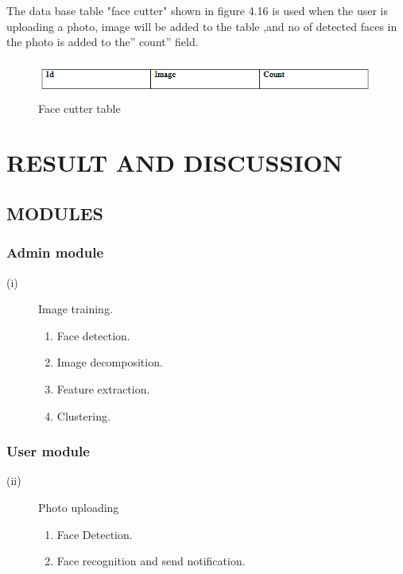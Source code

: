 \justifying
The data base table "face cutter" shown in figure 4.16 is used when the user is uploading a photo, image will be added to the table ,and no of detected faces in the   photo is added to the” count”  field.
\begin{figure}[H]
\begin{minipage}{1\linewidth}
\centering
 \includegraphics[width=\textwidth]{tbl8.png}
            \caption[Face Cutter Table]{Face cutter table}
             \label{ft}
\end{minipage}
\end{figure}

\clearpage
\chapter[TASK SETUP AND IMPLEMENTATION]{\fontsize{16}{12}\selectfont RESULT AND DISCUSSION}
\section[Modules]{\fontsize{14}{12}\selectfont MODULES}
\subsection[Admin Module]{Admin module}
  \begin{description}
\item [(i)]Image training.
\begin{enumerate}
  \item Face detection.
   \item Image decomposition.
   \item Feature extraction.
   \item Clustering.
\end{enumerate}
\end{description}
\subsection[User Module]{User module}
\begin{description}
\item [(ii)]Photo uploading
\begin{enumerate}
  \item Face Detection.
   \item Face recognition and send notification. 
  \end{enumerate}
\end{description}
\clearpage
